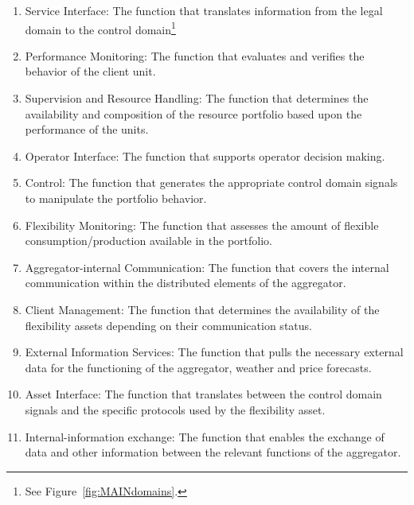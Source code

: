 \begin{enumerate}[label=\Alph*]
	\item Service Interface: The function that translates information from the legal domain to the control domain\footnote{See Figure~\ref{fig:MAINdomains}.}
	\item Performance Monitoring: The function that evaluates and verifies the behavior of the client unit.
	\item Supervision and Resource Handling: The function that determines the availability and composition of the resource portfolio based upon the performance of the units.
	\item Operator Interface: The function that supports operator decision making.
	\item Control: The function that generates the appropriate control domain signals to manipulate the portfolio behavior.
	\item Flexibility Monitoring: The function that assesses the amount of flexible consumption/production available in the portfolio.
	\item Aggregator-internal Communication: The function that covers the internal communication within the distributed elements of the aggregator.
	\item Client Management: The function that determines the availability of the flexibility assets depending on their communication status.
	\item External Information Services: The function that pulls the necessary external data for the functioning of the aggregator, \eg weather and price forecasts.
	\item Asset Interface: The function that translates between the control domain signals and the specific protocols used by the flexibility asset.
	\item Internal-information exchange: The function that enables the exchange of data and other information between the relevant functions of the aggregator.
\end{enumerate}

